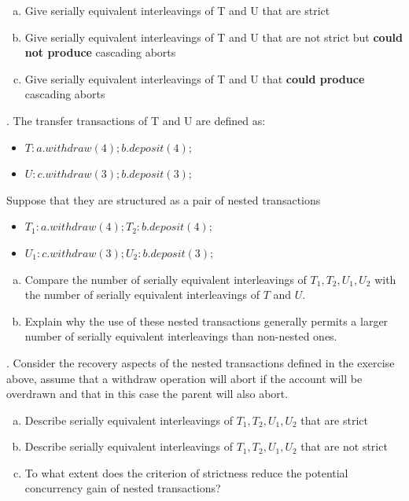 \documentclass[12pt]{article}
\newcounter{question}
\newcommand{\question}[1]{
    \stepcounter{question}
    \thequestion. #1 \hfill
}
\begin{document}
\begin{enumerate}[(a)]
    \item Give serially equivalent interleavings of T and U that are strict
    \item Give serially equivalent interleavings of T and U that are not strict but \textbf{could not produce} cascading aborts
    \item Give serially equivalent interleavings of T and U that \textbf{could produce} cascading aborts
\end{enumerate}

\bigskip

\question{The transfer transactions of T and U are defined as:}

\begin{itemize}
    \item $T: a.withdraw(4); b.deposit(4);$
    \item $U: c.withdraw(3); b.deposit(3);$
\end{itemize}

Suppose that they are structured as a pair of nested transactions

\begin{itemize}
    \item $T_1: a.withdraw(4); T_2: b.deposit(4);$
    \item $U_1: c.withdraw(3); U_2: b.deposit(3);$
\end{itemize}

\begin{enumerate}[(a)]
    \item Compare the number of serially equivalent interleavings of $T_1,T_2,U_1,U_2$ with the number of serially equivalent interleavings of $T$ and $U$.
    \item Explain why the use of these nested transactions generally permits a larger number of serially equivalent interleavings than non-nested ones.
\end{enumerate}

\bigskip

\question{Consider the recovery aspects of the nested transactions defined in the exercise above, assume that a withdraw operation will abort if the account will be overdrawn and that in this case the parent will also abort. }

\begin{enumerate}[(a)]
    \item Describe serially equivalent interleavings of $T_1, T_2, U_1, U_2$ that are strict
    \item Describe serially equivalent interleavings of $T_1, T_2, U_1, U_2$ that are not strict
    \item To what extent does the criterion of strictness reduce the potential concurrency gain of nested transactions?
\end{enumerate}
\end{document}
